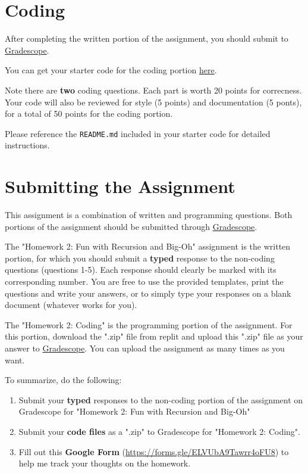 \documentclass [12pt]{article}
\begin{document}
\section{Coding}
 After completing the written portion of the assignment, you should submit to \href{https://www.gradescope.com/courses/350304}{Gradescope}.

You can get your starter code for the coding portion \href{https://replit.com/team/COMP285/HW2-Code}{here}.

Note there are \textbf{two} coding questions. Each part is worth 20 points for correcness. Your code will also be reviewed for style (5 points) and documentation (5 ponts), for a total of 50 points for the coding portion.

Please reference the \texttt{README.md} included in your starter code for detailed instructions.

\section*{Submitting the Assignment}

This assignment is a combination of written and programming questions. Both portions of the assignment should be submitted through \href{https://www.gradescope.com/courses/350304}{Gradescope}.

The "Homework 2: Fun with Recursion and Big-Oh" assignment is the written portion, for which you should submit a \textbf{typed} response to the non-coding questions (questions 1-5). Each response should clearly be marked with its corresponding number. You are free to use the provided templates, print the questions and write your answers, or to simply type your responses on a blank document (whatever works for you).

The "Homework 2: Coding" is the programming portion of the assignment. For this portion, download the ".zip" file from replit and upload this ".zip" file as your answer to \href{https://www.gradescope.com/courses/350304}{Gradescope}. You can upload the assignment as many times as you want.


To summarize, do the following:
\begin{enumerate}
    \item Submit your \textbf{typed} responses to the non-coding portion of the assignment on Gradescope for "Homework 2: Fun with Recursion and Big-Oh"
    \item Submit your \textbf{code files} as a ".zip" to Gradescope for "Homework 2: Coding".
    \item Fill out this \textbf{Google Form} (\href{https://forms.gle/ELVUbA9Tawrr4oFU8}{https://forms.gle/ELVUbA9Tawrr4oFU8}) to help me track your thoughts on the homework.
\end{enumerate}
\end{document}
